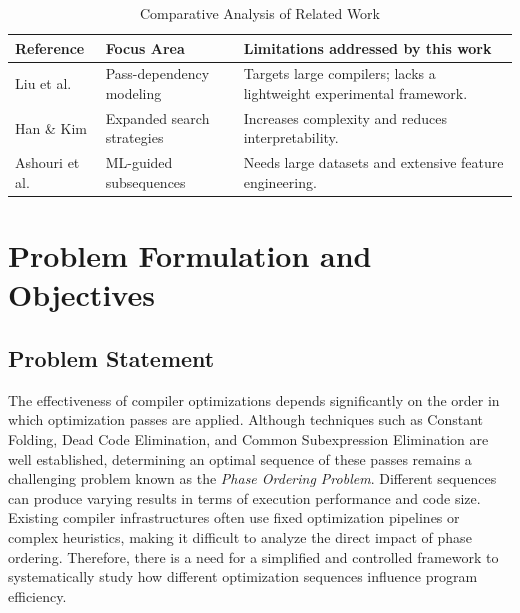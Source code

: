 \documentclass[conference]{IEEEtran}
\begin{document}
\begin{table}[htbp]
\caption{Comparative Analysis of Related Work}
\label{tab:lit_review}
\centering
\renewcommand{\arraystretch}{1.3}
\begin{tabularx}{\columnwidth}{@{}p{} p{} X@{}}
\toprule
\textbf{Reference} & \textbf{Focus Area} & \textbf{Limitations addressed by this work} \\
\midrule
Liu et al. \cite{ref1} & Pass-dependency modeling & Targets large compilers; lacks a lightweight experimental framework. \\
\addlinespace
Han \& Kim \cite{ref2} & Expanded search strategies & Increases complexity and reduces interpretability. \\
\addlinespace
Ashouri et al. \cite{ref15} & ML-guided subsequences & Needs large datasets and extensive feature engineering. \\
\bottomrule
\end{tabularx}
\end{table}

\section{Problem Formulation and Objectives}

\subsection{Problem Statement}
The effectiveness of compiler optimizations depends significantly on the order in which optimization passes are applied. Although techniques such as Constant Folding, Dead Code Elimination, and Common Subexpression Elimination are well established, determining an optimal sequence of these passes remains a challenging problem known as the \textit{Phase Ordering Problem}. Different sequences can produce varying results in terms of execution performance and code size. Existing compiler infrastructures often use fixed optimization pipelines or complex heuristics, making it difficult to analyze the direct impact of phase ordering. Therefore, there is a need for a simplified and controlled framework to systematically study how different optimization sequences influence program efficiency.
\end{document}
